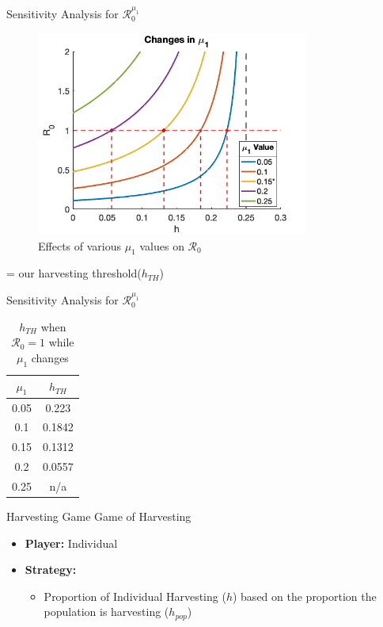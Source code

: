 \documentclass{beamer}
\begin{document}
\begin{frame}{Sensitivity Analysis for $\mathscr{R}_{0}^{\mu_1}$}
    \begin{figure}
        \centering
        \includegraphics[width=0.8\textwidth]{Latex/Figures/Graphs/mu1_sens_analysis.png}
        \caption{Effects of various $\mu_{1}$ values on $\mathscr{R}_{0}$}
        \label{fig:mu1_sens_analysis}
    \end{figure}
    \vspace{-0.6cm}
    \begin{center}
        \scriptsize * = our harvesting threshold($h_{TH}$)
    \end{center}
\end{frame}

\begin{frame}{Sensitivity Analysis for $\mathscr{R}_{0}^{\mu_1}$}
    \begin{table}[H]
        \centering
        \begin{tabular}{c|c}
             $\mu_{1}$ & $h_{TH}$ \\
             \hline
             0.05 & 0.223\\
             0.1 & 0.1842\\
             0.15 & 0.1312\\
             0.2 & 0.0557\\
             0.25 & n/a\\
        \end{tabular}
        \caption{$h_{TH}$ when $\mathscr{R}_{0}=1$ while $\mu_{1}$ changes}
        \label{tab:mu1_sens_analysis_values}
    \end{table}
\end{frame}

\begin{frame}{Harvesting Game}
Game of Harvesting 
\begin{itemize}
    \item \textbf{Player:} Individual
    \item \textbf{Strategy: } 
        \begin{itemize}
            \item Proportion of Individual Harvesting ($h$) based on the proportion the population is harvesting ($h_{pop}$)
        \end{itemize}
\end{itemize}
\end{frame}
\end{document}
